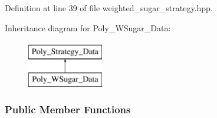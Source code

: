 Definition at line 39 of file weighted\+\_\+sugar\+\_\+strategy.\+hpp.

Inheritance diagram for Poly\+\_\+\+W\+Sugar\+\_\+\+Data\+:\begin{figure}[H]
\begin{center}
\leavevmode
\includegraphics[height=2.000000cm]{group__strategygroup}
\end{center}
\end{figure}
\subsubsection*{Public Member Functions}
